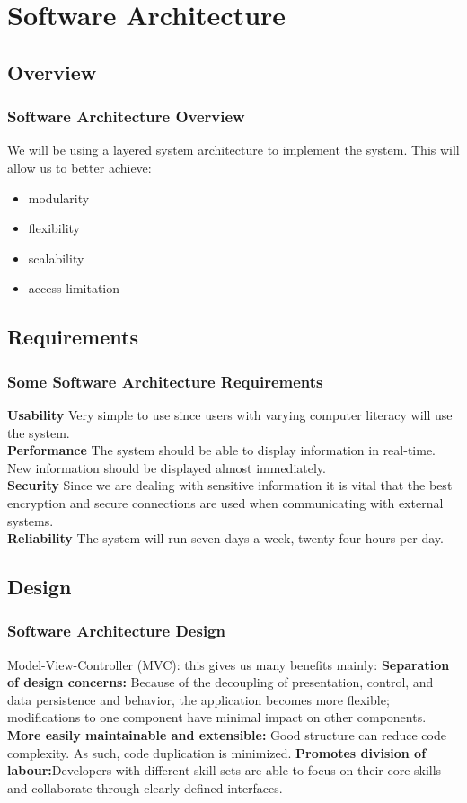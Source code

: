 \documentclass{beamer}
\begin{document}
\section{Software Architecture}
	\subsection{Overview}
		\begin{frame}
		\frametitle{Software Architecture Overview}
			We will be using a layered system architecture to implement the system. This will allow us to better achieve:
			\begin{itemize}
				\item modularity
				\item flexibility
				\item scalability
				\item access limitation
			\end{itemize}
		\end{frame}
		
	\subsection{Requirements}
		\begin{frame}
		\frametitle{Some Software Architecture Requirements}
			\textbf{Usability} Very simple to use since users with varying computer literacy will use the system.\\
			\textbf{Performance} The system should be able to display information in real-time. New information should be displayed almost immediately.\\
			\textbf{Security} Since we are dealing with sensitive information it is vital that the best encryption and secure connections are used when communicating with external systems.\\
			\textbf{Reliability} The system will run seven days a week, twenty-four hours per day.
		\end{frame}
		
	\subsection{Design}
		\begin{frame}
		\frametitle{Software Architecture Design}
		 Model-View-Controller (MVC): this gives us many benefits mainly:
         	\textbf{Separation of design concerns:} Because of the decoupling of presentation, control, and data persistence and behavior, the application becomes more ﬂexible; modiﬁcations to one component have minimal impact on other components.\\
        	\textbf{More easily maintainable and extensible:} Good structure can reduce code complexity. As such, code duplication is minimized.
        	\textbf{Promotes division of labour:}Developers with diﬀerent skill sets are able to focus on their core skills and collaborate through clearly deﬁned interfaces.\\
		\end{frame}
		
\end{document}
